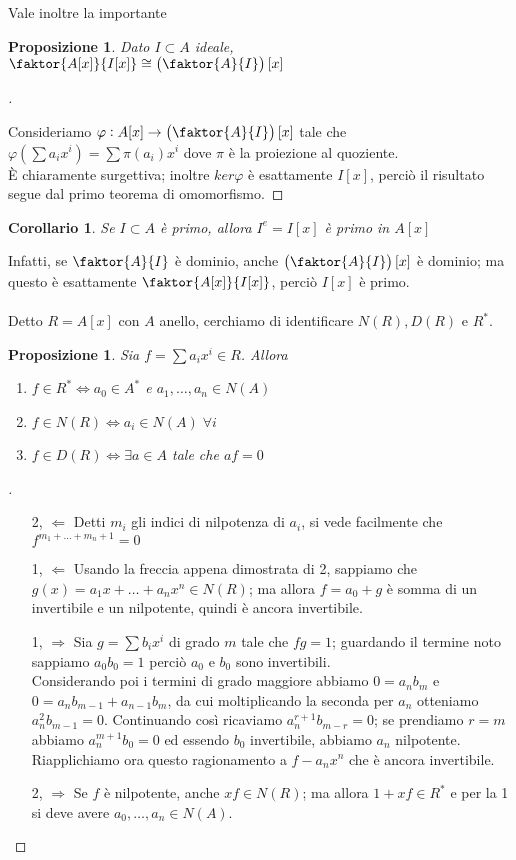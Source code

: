 \documentclass[a4paper,10pt]{article}
\theoremstyle{plain}
\newtheorem{prop}[thm]{Proposizione}
\newtheorem*{cor}{Corollario}
\theoremstyle{definition}
\newenvironment{myproof}[1][\proofname]{%
  \begin{proof}[#1]$ $\par\nobreak\ignorespaces
}{%
  \qedhere
  \end{proof}
}
\begin{document}
Vale inoltre la importante
\begin{prop}
    Dato $I\subset A$ ideale, $\displaystyle \faktor{A[x]}{I[x]}\cong \left(\faktor{A}{I}\right)[x]$
\end{prop}
\begin{myproof}
    Consideriamo $\displaystyle\varphi: A[x]\to \left(\faktor{A}{I}\right)[x]$ tale che $\displaystyle\varphi\left(\sum a_ix^i\right)=\sum \pi(a_i)x^i$ dove $\pi$ è la proiezione al quoziente.\\
    È chiaramente surgettiva; inoltre $ker\varphi$ è esattamente $I[x]$, perciò il risultato segue dal primo teorema di omomorfismo.
\end{myproof}
\begin{cor}
    Se $I\subset A$ è primo, allora $I^e=I[x]$ è primo in $A[x]$
\end{cor}
Infatti, se $\faktor{A}{I}$ è dominio, anche $\left(\faktor{A}{I}\right)[x]$ è dominio; ma questo è esattamente $\faktor{A[x]}{I[x]}$, perciò $I[x]$ è primo.\\
\\
Detto $R=A[x]$ con $A$ anello, cerchiamo di identificare $N(R),D(R)$ e $R^\ast$.\\
\begin{prop}
    Sia $f=\sum a_ix^i\in R$. Allora
    \begin{enumerate}
        \item $f\in R^\ast \iff a_0\in A^\ast$ e $a_1,\dots,a_n\in N(A)$
        \item $f\in N(R)\iff a_i\in N(A)\;\forall i$
        \item $f\in D(R)\iff \exists a\in A$ tale che $af=0$
    \end{enumerate}
\end{prop}
\begin{myproof}
    \begin{itemize}
        \item[2, $\Leftarrow$] Detti $m_i$ gli indici di nilpotenza di $a_i$, si vede facilmente che $f^{m_1+\dots+m_n+1}=0$
        \item[1, $\Leftarrow$] Usando la freccia appena dimostrata di 2, sappiamo che $g(x)=a_1x+\dots+a_nx^n\in N(R)$; ma allora $f=a_0+g$ è somma di un invertibile e un nilpotente, quindi è ancora invertibile.
        \item[1, $\Rightarrow$] Sia $g=\sum b_ix^i$ di grado $m$ tale che $fg=1$; guardando il termine noto sappiamo $a_0b_0=1$ perciò $a_0$ e $b_0$ sono invertibili.\\
        Considerando poi i termini di grado maggiore abbiamo $0=a_nb_m$ e $0=a_nb_{m-1}+a_{n-1}b_m$, da cui moltiplicando la seconda per $a_n$ otteniamo $a_n^2b_{m-1}=0$.
        Continuando così ricaviamo $a_n^{r+1}b_{m-r}=0$; se prendiamo $r=m$ abbiamo $a_n^{m+1}b_0=0$ ed essendo $b_0$ invertibile, abbiamo $a_n$ nilpotente.\\
        Riapplichiamo ora questo ragionamento a $f-a_nx^n$ che è ancora invertibile.
        \item[2, $\Rightarrow$] Se $f$ è nilpotente, anche $xf\in N(R)$; ma allora $1+xf\in R^\ast$ e per la 1 si deve avere $a_0,\dots,a_n\in N(A)$.
    \end{itemize}
\end{myproof}
\end{document}
